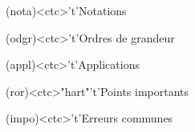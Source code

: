 \documentclass[../../main/main.tex]{subfiles}
\begin{document}
\begin{tcn}[%
		sidebyside, fontupper=\small, fontlower=\small
	]
\begin{tcn}[nsp]
	\end{tcn}
	\begin{tcn}[nsp](nota)<ctc>'t'{Notations}
	\end{tcn}
	\begin{tcn}[nsp](odgr)<ctc>'t'{Ordres de grandeur}
	\end{tcn}
	\begin{tcn}[nsp](appl)<ctc>'t'{Applications}
	\end{tcn}
	\begin{tcn}[nsp](ror)<ctc>"hart"'t'{Points importants}
	\end{tcn}
	\begin{tcn}[nsp](impo)<ctc>'t'{Erreurs communes}
	\end{tcn}
\end{tcn}
\end{document}
